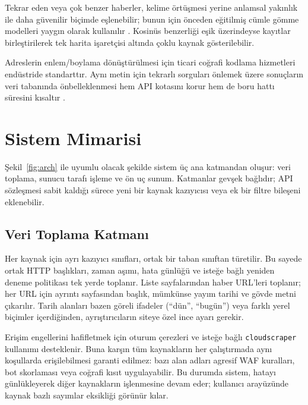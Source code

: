 \documentclass[conference,a4paper]{IEEEtran}
\begin{document}
Tekrar eden veya çok benzer haberler, kelime örtüşmesi yerine anlamsal yakınlık ile daha güvenilir biçimde eşlenebilir; bunun için önceden eğitilmiş cümle gömme modelleri yaygın olarak kullanılır \cite{reimers2019}. Kosinüs benzerliği eşik üzerindeyse kayıtlar birleştirilerek tek harita işaretçisi altında çoklu kaynak gösterilebilir.

Adreslerin enlem/boylama dönüştürülmesi için ticari coğrafi kodlama hizmetleri endüstride standarttır. Aynı metin için tekrarlı sorguları önlemek üzere sonuçların veri tabanında önbelleklenmesi hem API kotasını korur hem de boru hattı süresini kısaltır \cite{googlegeo}.

\section{Sistem Mimarisi}
Şekil~\ref{fig:arch} ile uyumlu olacak şekilde sistem üç ana katmandan oluşur: veri toplama, sunucu tarafı işleme ve ön uç sunum. Katmanlar gevşek bağlıdır; API sözleşmesi sabit kaldığı sürece yeni bir kaynak kazıyıcısı veya ek bir filtre bileşeni eklenebilir.

\subsection{Veri Toplama Katmanı}
Her kaynak için ayrı kazıyıcı sınıfları, ortak bir taban sınıftan türetilir. Bu sayede ortak HTTP başlıkları, zaman aşımı, hata günlüğü ve isteğe bağlı yeniden deneme politikası tek yerde toplanır. Liste sayfalarından haber URL'leri toplanır; her URL için ayrıntı sayfasından başlık, mümkünse yayım tarihi ve gövde metni çıkarılır. Tarih alanları bazen göreli ifadeler (``dün'', ``bugün'') veya farklı yerel biçimler içerdiğinden, ayrıştırıcıların siteye özel ince ayarı gerekir.

Erişim engellerini hafifletmek için oturum çerezleri ve isteğe bağlı \texttt{cloudscraper} kullanımı desteklenir. Buna karşın tüm kaynakların her çalıştırmada aynı koşullarda erişilebilmesi garanti edilmez: bazı alan adları agresif WAF kuralları, bot skorlaması veya coğrafi kısıt uygulayabilir. Bu durumda sistem, hatayı günlükleyerek diğer kaynakların işlenmesine devam eder; kullanıcı arayüzünde kaynak bazlı sayımlar eksikliği görünür kılar.
\end{document}
